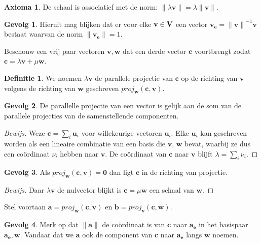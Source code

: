 \documentclass{amsart}
\theoremstyle{definition}
\newtheorem{axm}{Axioma}[section]
\newtheorem{dfn}{Definitie}[section]
\newtheorem{csq}{Gevolg}[section]
\newenvironment{bewijs}{\begin{proof}[Bewijs]}{\end{proof}}
\newcommand{\vecspace}[1][v]{\mathrm{\mathbf{\MakeUppercase#1}}}
\newcommand{\norm}[1]{\lVert{#1}\rVert}
\newcommand{\vvec}[1][v]{\mathbf{#1}}
\newcommand{\uvec}[1][v]{\vvec[#1]_\mathbf{e}}
\newcommand{\vnorm}[1]{\norm{\vvec[#1]}}
\newcommand{\zerovec}{\vvec[0]}
\begin{document}
\begin{axm}
    De schaal is associatief met de norm: $\norm{\lambda \vvec} = \lambda\vnorm v$.
\end{axm}

\begin{csq}
    Hieruit mag blijken dat er voor elke $\vvec \in \vecspace$ een vector $\uvec = {\vnorm v}^{-1}\vvec$ bestaat waarvan de norm $\vnorm \uvec = 1$.
\end{csq}

Beschouw een vrij paar vectoren $\vvec, \vvec[w]$ dat een derde vector $\vvec[c]$ voortbrengt zodat $\vvec[c] = \lambda \vvec + \mu \vvec[w]$.

\begin{dfn}
    We noemen $\lambda\vvec$ de parallele projectie van $\vvec[c]$ op de richting van $\vvec$ volgens de richting van $\vvec[w]$ geschreven $proj_{\vvec[w]}(\vvec[c], \vvec)$.
\end{dfn}

\begin{csq}
    De parallelle projectie van een vector is gelijk aan de som van de parallele projecties van de samenstellende componenten.
    \begin{bewijs}
        Weze $\vvec[c] = \sum_{i} {\vvec[u]}_i$ voor willekeurige vectoren $\vvec[u]_i$.
        Elke ${\vvec[u]}_i$ kan geschreven worden als een lineaire combinatie van een basis die $\vvec$, $\vvec[w]$ bevat, waarbij ze dus een coördinaat $\nu_i$ hebben naar $\vvec$.
        De coördinaat van $\vvec[c]$ naar $\vvec$ blijft $\lambda = \sum_i \nu_i$.
    \end{bewijs}
\end{csq}

\begin{csq}
    Als $proj_{\vvec[w]}(\vvec[c], \vvec) = \zerovec$ dan ligt $\vvec[c]$ in de richting van projectie.
    \begin{bewijs}
        Daar $\lambda\vvec$ de nulvector blijkt is $\vvec[c] = \mu\vvec[w]$ een schaal van $\vvec[w]$.
    \end{bewijs}
\end{csq}

Stel voortaan $\vvec[a] = proj_{\vvec[w]}(\vvec[c], \vvec)$ en $\vvec[b] = proj_{\vvec}(\vvec[c], \vvec[w])$.

\begin{csq}
    Merk op dat $\vnorm{a}$ de coördinaat is van $\vvec[c]$ naar $\uvec[a]$ in het basispaar $\uvec[a], \vvec[w]$.
    Vandaar dat we $\vvec[a]$ ook de component van $\vvec[c]$ naar $\uvec[a]$ langs $\vvec[w]$ noemen.
\end{csq}
\end{document}
